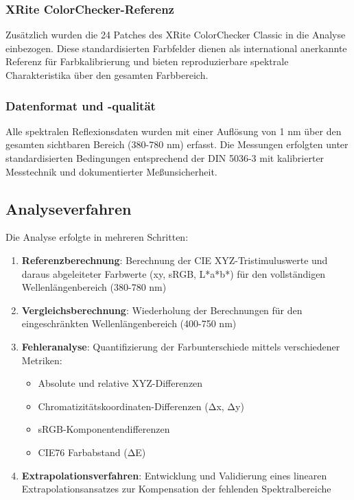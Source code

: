 \subsubsection{XRite ColorChecker-Referenz}

Zusätzlich wurden die 24 Patches des XRite ColorChecker Classic \parencite{XRiteColorChecker} in die Analyse einbezogen. Diese standardisierten Farbfelder dienen als international anerkannte Referenz für Farbkalibrierung und bieten reproduzierbare spektrale Charakteristika über den gesamten Farbbereich.

\subsubsection{Datenformat und -qualität}

Alle spektralen Reflexionsdaten wurden mit einer Auflösung von 1 nm über den gesamten sichtbaren Bereich (380-780 nm) erfasst. Die Messungen erfolgten unter standardisierten Bedingungen entsprechend der DIN 5036-3 \parencite{DIN5036-3} mit kalibrierter Messtechnik und dokumentierter Meßunsicherheit.

\subsection{Analyseverfahren}

Die Analyse erfolgte in mehreren Schritten:

\begin{enumerate}
    \item \textbf{Referenzberechnung}: Berechnung der CIE XYZ-Tristimuluswerte und daraus abgeleiteter Farbwerte (xy, sRGB, L*a*b*) für den vollständigen Wellenlängenbereich (380-780 nm)
    
    \item \textbf{Vergleichsberechnung}: Wiederholung der Berechnungen für den eingeschränkten Wellenlängenbereich (400-750 nm)
    
    \item \textbf{Fehleranalyse}: Quantifizierung der Farbunterschiede mittels verschiedener Metriken:
    \begin{itemize}
        \item Absolute und relative XYZ-Differenzen
        \item Chromatizitätskoordinaten-Differenzen (Δx, Δy)
        \item sRGB-Komponentendifferenzen
        \item CIE76 Farbabstand (ΔE)
    \end{itemize}
    
    \item \textbf{Extrapolationsverfahren}: Entwicklung und Validierung eines linearen Extrapolationsansatzes zur Kompensation der fehlenden Spektralbereiche
\end{enumerate}

